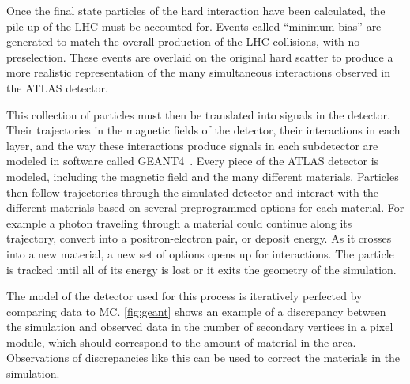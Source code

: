 Once the final state particles of the hard interaction have been calculated, the pile-up of the \ac{LHC} must be accounted for. Events called ``minimum bias'' are generated to match the overall production of the \ac{LHC} collisions, with no preselection. These events are overlaid on the original hard scatter to produce a more realistic representation of the many simultaneous interactions observed in the ATLAS detector.

This collection of particles must then be translated into signals in the detector. Their trajectories in the magnetic fields of the detector, their interactions in each layer, and the way these interactions produce signals in each subdetector are modeled in software called {\sc GEANT4}~\cite{Agostinelli:2002hh}. Every piece of the ATLAS detector is modeled, including the magnetic field and the many different materials. Particles then follow trajectories through the simulated detector and interact with the different materials based on several preprogrammed options for each material. For example a photon traveling through a material could continue along its trajectory, convert into a positron-electron pair, or deposit energy. As it crosses into a new material, a new set of options opens up for interactions. The particle is tracked until all of its energy is lost or it exits the geometry of the simulation.

The model of the detector used for this process is iteratively perfected by comparing data to \ac{MC}. \autoref{fig:geant} shows an example of a discrepancy between the simulation and observed data in the number of secondary vertices in a pixel module, which should correspond to the amount of material in the area. Observations of discrepancies like this can be used to correct the materials in the simulation. 

